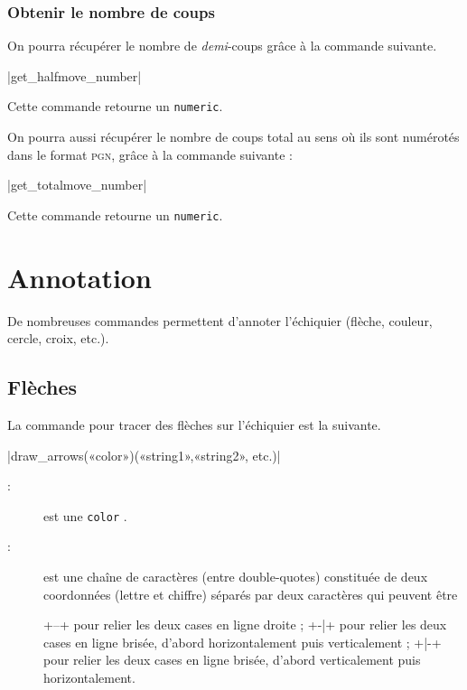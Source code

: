 \documentclass[french]{ltxdoc}
\begin{document}
\subsubsection{Obtenir le nombre de coups}

On pourra récupérer le nombre de \emph{demi}-coups grâce à la
commande suivante.

\commande|get_halfmove_number|\smallskip

Cette commande retourne un \lstinline+numeric+.

On pourra aussi récupérer le nombre de coups \og{}total\fg{} au sens où ils sont numérotés dans le format \textsc{pgn}, grâce à la commande suivante :

\commande|get_totalmove_number|\smallskip

Cette commande retourne un \lstinline+numeric+.

\section{Annotation}

De nombreuses commandes permettent d’annoter l’échiquier (flèche, couleur, cercle, croix, etc.).

\subsection{Flèches}

La commande pour tracer des flèches sur l’échiquier est la suivante.

\commande|draw_arrows(«color»)(«string1»,«string2», etc.)|\smallskip
\begin{description}
\item[:] est une \lstinline+color+ \MP.
\item[:] est une chaîne de caractères (entre double-quotes) constituée de deux coordonnées (lettre et chiffre) séparés par deux caractères qui peuvent être
\begin{description}
\vitem+--+ pour relier les deux cases en ligne droite ;
\vitem+-|+ pour relier les deux cases en ligne brisée, d’abord horizontalement puis verticalement ;
\vitem+|-+ pour relier les deux cases en ligne brisée, d’abord verticalement puis horizontalement.
\end{description}
\end{description}
\end{document}
